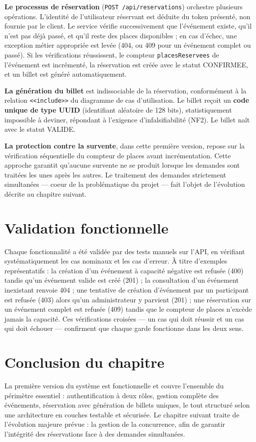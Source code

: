 \documentclass[12pt,a4paper]{report}
\newcommand{\code}[1]{\textcolor{codecolor}{\texttt{#1}}}
\begin{document}
\textbf{Le processus de réservation} (\code{POST /api/reservations}) orchestre plusieurs opérations. L'identité de l'utilisateur réservant est déduite du token présenté, non fournie par le client. Le service vérifie successivement que l'événement existe, qu'il n'est pas déjà passé, et qu'il reste des places disponibles ; en cas d'échec, une exception métier appropriée est levée (404, ou 409 pour un événement complet ou passé). Si les vérifications réussissent, le compteur \code{placesReservees} de l'événement est incrémenté, la réservation est créée avec le statut CONFIRMEE, et un billet est généré automatiquement.

\textbf{La génération du billet} est indissociable de la réservation, conformément à la relation \code{<<include>>} du diagramme de cas d'utilisation. Le billet reçoit un \textbf{code unique de type UUID} (identifiant aléatoire de 128 bits), statistiquement impossible à deviner, répondant à l'exigence d'infalsifiabilité (NF2). Le billet naît avec le statut VALIDE.

\textbf{La protection contre la survente}, dans cette première version, repose sur la vérification séquentielle du compteur de places avant incrémentation. Cette approche garantit qu'aucune survente ne se produit lorsque les demandes sont traitées les unes après les autres. Le traitement des demandes strictement simultanées — coeur de la problématique du projet — fait l'objet de l'évolution décrite au chapitre suivant.

\section{Validation fonctionnelle}

Chaque fonctionnalité a été validée par des tests manuels sur l'API, en vérifiant systématiquement les cas nominaux et les cas d'erreur. À titre d'exemples représentatifs : la création d'un événement à capacité négative est refusée (400) tandis qu'un événement valide est créé (201) ; la consultation d'un événement inexistant renvoie 404 ; une tentative de création d'événement par un participant est refusée (403) alors qu'un administrateur y parvient (201) ; une réservation sur un événement complet est refusée (409) tandis que le compteur de places n'excède jamais la capacité. Ces vérifications croisées — un cas qui doit réussir et un cas qui doit échouer — confirment que chaque garde fonctionne dans les deux sens.

\section{Conclusion du chapitre}

La première version du système est fonctionnelle et couvre l'ensemble du périmètre essentiel : authentification à deux rôles, gestion complète des événements, réservation avec génération de billets uniques, le tout structuré selon une architecture en couches testable et sécurisée. Le chapitre suivant traite de l'évolution majeure prévue : la gestion de la concurrence, afin de garantir l'intégrité des réservations face à des demandes simultanées.
\end{document}
